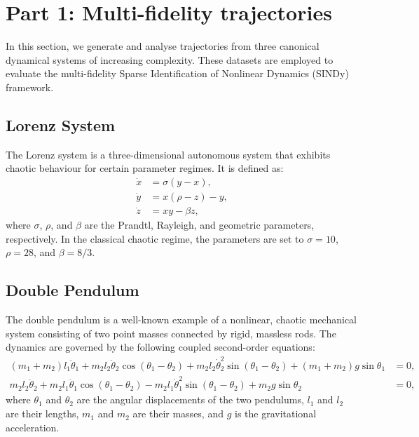 \section{Part 1: Multi-fidelity trajectories}

In this section, we generate and analyse trajectories from three canonical dynamical systems of increasing complexity. These datasets are employed to evaluate the multi-fidelity Sparse Identification of Nonlinear Dynamics (SINDy) framework.

\subsection{Lorenz System}

The Lorenz system \cite{lorenz1963deterministic} is a three-dimensional autonomous system that exhibits chaotic behaviour for certain parameter regimes. It is defined as:
\begin{equation}
\begin{aligned}
\dot{x} &= \sigma (y - x), \\
\dot{y} &= x(\rho - z) - y, \\
\dot{z} &= xy - \beta z,
\end{aligned}
\label{eq:lorenz}
\end{equation}
where $\sigma$, $\rho$, and $\beta$ are the Prandtl, Rayleigh, and geometric parameters, respectively. In the classical chaotic regime, the parameters are set to $\sigma = 10$, $\rho = 28$, and $\beta = 8/3$.

\subsection{Double Pendulum}

The double pendulum is a well-known example of a nonlinear, chaotic mechanical system consisting of two point masses connected by rigid, massless rods. The dynamics are governed by the following coupled second-order equations:
\begin{equation}
\begin{aligned}
(m_1 + m_2) l_1 \ddot{\theta}_1 + m_2 l_2 \ddot{\theta}_2 \cos(\theta_1 - \theta_2)
+ m_2 l_2 \dot{\theta}_2^2 \sin(\theta_1 - \theta_2)
+ (m_1 + m_2) g \sin \theta_1 &= 0, \\
m_2 l_2 \ddot{\theta}_2 + m_2 l_1 \ddot{\theta}_1 \cos(\theta_1 - \theta_2)
- m_2 l_1 \dot{\theta}_1^2 \sin(\theta_1 - \theta_2)
+ m_2 g \sin \theta_2 &= 0,
\end{aligned}
\label{eq:double_pendulum}
\end{equation}
where $\theta_1$ and $\theta_2$ are the angular displacements of the two pendulums, $l_1$ and $l_2$ are their lengths, $m_1$ and $m_2$ are their masses, and $g$ is the gravitational acceleration.

